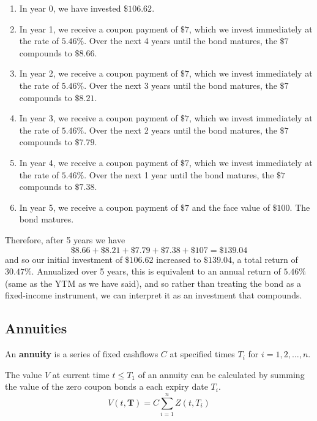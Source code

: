 \documentclass{article}
\begin{document}
    \begin{enumerate}
      \item In year 0, we have invested $\$106.62$.
      \item In year 1, we receive a coupon payment of $\$7$, which we invest immediately at the rate of $5.46\%$. Over the next 4 years until the bond matures, the $\$7$ compounds to $\$8.66$.
      \item In year 2, we receive a coupon payment of $\$7$, which we invest immediately at the rate of $5.46\%$. Over the next 3 years until the bond matures, the $\$7$ compounds to $\$8.21$.
      \item In year 3, we receive a coupon payment of $\$7$, which we invest immediately at the rate of $5.46\%$. Over the next 2 years until the bond matures, the $\$7$ compounds to $\$7.79$.
      \item In year 4, we receive a coupon payment of $\$7$, which we invest immediately at the rate of $5.46\%$. Over the next 1 year until the bond matures, the $\$7$ compounds to $\$7.38$.
      \item In year 5, we receive a coupon payment of $\$7$ and the face value of $\$100$. The bond matures.
    \end{enumerate}

    Therefore, after 5 years we have
    \begin{equation}
      \$8.66+\$8.21 + \$7.79 + \$7.38 + \$107 = \$139.04
    \end{equation}
    and so our initial investment of $\$106.62$ increased to $\$139.04$, a total return of $30.47\%$. Annualized over 5 years, this is equivalent to an annual return of $5.46\%$ (same as the YTM as we have said), and so rather than treating the bond as a fixed-income instrument, we can interpret it as an investment that compounds.

  \subsection{Annuities}

    \begin{definition}[Annuity]
      An \textbf{annuity} is a series of fixed cashflows $C$ at specified times $T_i$ for $i = 1, 2, \ldots, n$. 
    \end{definition}

    \begin{theorem}
      The value $V$ at current time $t \leq T_1$ of an annuity can be calculated by summing the value of the zero coupon bonds a each expiry date $T_i$. 
      \begin{equation}
        V(t, \mathbf{T}) = C \sum_{i=1}^n Z(t, T_i)
      \end{equation}
    \end{theorem}
\end{document}
